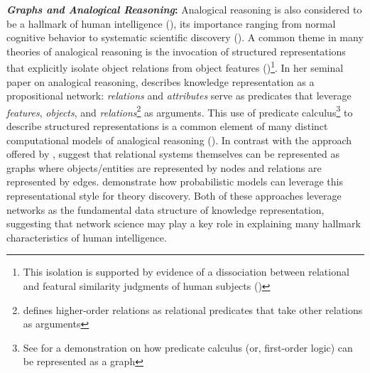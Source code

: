 \documentclass[12pt]{article}
\let\oldcite=\cite
\let\oldtextcite=\textcite
\renewcommand{\cite}[1]{\textcolor[rgb]{0, .121, .388}{\oldcite{#1}}}
\renewcommand{\textcite}[1]{\textcolor[rgb]{0, .121, .388}{\oldtextcite{#1}}}
\begin{document}
\textbf{\emph{Graphs and Analogical Reasoning}:} Analogical reasoning is also considered to be a hallmark of human intelligence (\cite{penn2008darwin}), its importance ranging from normal cognitive behavior to systematic scientific discovery (\cite{gentner1997reasoning,gust2008analogical,black1966models}). A common theme in many theories of analogical reasoning is the invocation of structured representations that explicitly isolate object relations from object features (\cite{gentner1983structure,forbus2017extending,hummel1997distributed,doumas2008theory,larkey2003cab})\footnote{This isolation is supported by evidence of a dissociation between relational and featural similarity judgments of human subjects (\cite{goldstone1991relational})}. In her seminal paper on analogical reasoning, \textcite{gentner1983structure} describes knowledge representation as a propositional network: \emph{relations} and \emph{attributes} serve as predicates that leverage \emph{features}, \emph{objects}, and \emph{relations}\footnote{\textcite{gentner1983structure} defines higher-order relations as relational predicates that take other relations as arguments} as arguments. This use of predicate calculus\footnote{See \textcite{rensink2004representing} for a demonstration on how predicate calculus (or, first-order logic) can be represented as a graph} to describe structured representations is a common element of many distinct computational models of analogical reasoning (\cite{forbus2017extending,hummel1997distributed,doumas2008theory,larkey2003cab}). In contrast with the approach offered by \textcite{gentner1983structure}, \textcite{kemp2004discovering} suggest that relational systems themselves can be represented as graphs where objects/entities are represented by nodes and relations are represented by edges. \textcite{kemp2010probabilistic} demonstrate how probabilistic models can leverage this representational style for theory discovery. Both of these approaches leverage networks as the fundamental data structure of knowledge representation, suggesting that network science may play a key role in explaining many hallmark characteristics of human intelligence.
\end{document}
